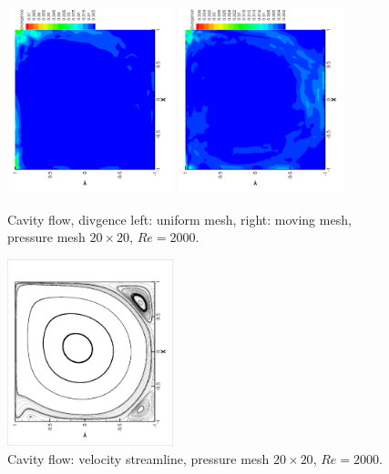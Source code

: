 \documentclass{eajam}
\begin{document}
       \begin{figure}[!htbp]
         \begin{center}
             \includegraphics[width = 0.43\textwidth, angle = -90]{picture/cavity_flow_data/divergence_uniform_1.eps}
             \includegraphics[width = 0.43\textwidth, angle = -90]{picture/cavity_flow_data/divergence_moving_1.eps}
        \end{center}
        \caption{\small Cavity flow, divgence left: uniform mesh,
          right: moving mesh, pressure mesh $20 \times 20$, $Re = 2000$.}
        \label{fig::cavity_flow_divergence}
       \end{figure}

       \begin{figure}[!htbp]
         \begin{center}
             \includegraphics[width = 0.43\textwidth, angle = -90]{picture/cavity_flow_data/streamline_mesh20.eps}
        \end{center}
        \caption{\small Cavity flow: velocity streamline, pressure
          mesh $20 \times 20$, $Re = 2000$.}
        \label{fig::cavity_flow_streamline}
       \end{figure}
\end{document}
